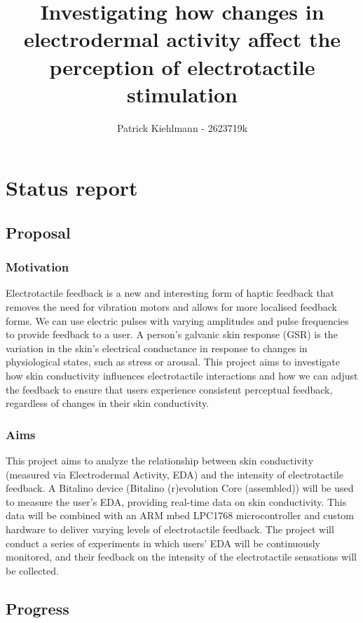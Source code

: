 \documentclass[11pt]{article}
\title{Investigating how changes in electrodermal activity affect the perception of electrotactile stimulation}
\author{Patrick Kiehlmann - 2623719k}
\begin{document}
    \maketitle
    
    
    
\section{Status report}

\subsection{Proposal}\label{proposal}

\subsubsection{Motivation}\label{motivation}
Electrotactile feedback is a new and interesting form of haptic feedback that removes the need for vibration motors and allows for more localised feedback forms. We can use electric pulses with varying amplitudes and pulse frequencies to provide feedback to a user. A person's galvanic skin response (GSR) is the variation in the skin's electrical conductance in response to changes in physiological states, such as stress or arousal. This project aims to investigate how skin conductivity influences electrotactile interactions and how we can adjust the feedback to ensure that users experience consistent perceptual feedback, regardless of changes in their skin conductivity.


\subsubsection{Aims}\label{aims}
This project aims to analyze the relationship between skin conductivity (measured via Electrodermal Activity, EDA) and the intensity of electrotactile feedback. A Bitalino device (Bitalino (r)evolution Core (assembled)) will be used to measure the user's EDA, providing real-time data on skin conductivity. This data will be combined with an ARM mbed LPC1768 microcontroller and custom hardware to deliver varying levels of electrotactile feedback. The project will conduct a series of experiments in which users' EDA will be continuously monitored, and their feedback on the intensity of the electrotactile sensations will be collected.

\subsection{Progress}\label{progress}
\end{document}
